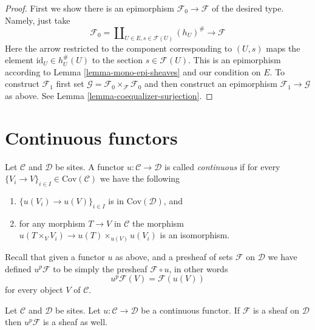 \begin{proof}
First we show there is an epimorphism $\mathcal{F}_0 \to \mathcal{F}$
of the desired type. Namely, just take
$$
\mathcal{F}_0 =
\coprod\nolimits_{U \in E, s \in \mathcal{F}(U)}
(h_U)^\# \longrightarrow \mathcal{F}
$$
Here the arrow restricted to the component corresponding to $(U, s)$ maps
the element $\text{id}_U \in h_U^\#(U)$ to the section $s \in \mathcal{F}(U)$.
This is an epimorphism according to Lemma \ref{lemma-mono-epi-sheaves} and
our condition on $E$. To construct $\mathcal{F}_1$ first set
$\mathcal{G} = \mathcal{F}_0 \times_\mathcal{F} \mathcal{F}_0$ and
then construct an epimorphism $\mathcal{F}_1 \to \mathcal{G}$
as above. See Lemma \ref{lemma-coequalizer-surjection}.
\end{proof}


\section{Continuous functors}
\label{section-continuous-functors}

\begin{definition}
\label{definition-continuous}
Let $\mathcal{C}$ and $\mathcal{D}$ be sites.
A functor $u : \mathcal{C} \to \mathcal{D}$ is called
{\it continuous} if for every
$\{V_i \to V\}_{i\in I} \in \text{Cov}(\mathcal{C})$
we have the following
\begin{enumerate}
\item $\{u(V_i) \to u(V)\}_{i\in I}$ is in $\text{Cov}(\mathcal{D})$, and
\item for any morphism $T \to V$ in $\mathcal{C}$ the morphism
$u(T \times_V V_i) \to u(T) \times_{u(V)} u(V_i)$ is an isomorphism.
\end{enumerate}
\end{definition}

\noindent
Recall that given a functor $u$ as above, and a presheaf of sets
$\mathcal{F}$ on $\mathcal{D}$ we have defined
$u^p\mathcal{F}$ to be simply the presheaf
$\mathcal{F} \circ u$, in other words
$$
u^p\mathcal{F} (V) = \mathcal{F}(u(V))
$$
for every object $V$ of $\mathcal{C}$.

\begin{lemma}
\label{lemma-pushforward-sheaf}
Let $\mathcal{C}$ and $\mathcal{D}$ be sites.
Let $u : \mathcal{C} \to \mathcal{D}$ be a continuous functor.
If $\mathcal{F}$ is a sheaf on $\mathcal{D}$ then
$u^p\mathcal{F}$ is a sheaf as well.
\end{lemma}

